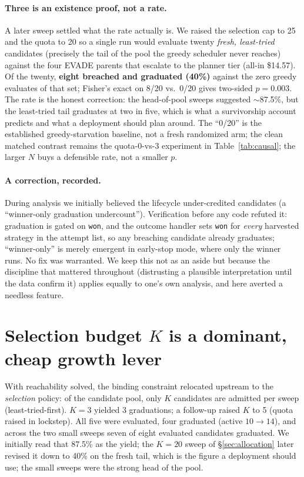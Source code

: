 \documentclass[letterpaper,twocolumn,10pt]{article}
\begin{document}
\paragraph{Three is an existence proof, not a rate.} A later sweep settled what the rate actually is. We raised the selection cap to 25 and the quota to 20 so a single run would evaluate twenty \emph{fresh, least-tried} candidates (precisely the tail of the pool the greedy scheduler never reaches) against the four EVADE parents that escalate to the planner tier (all-in \$14.57). Of the twenty, \textbf{eight breached and graduated (40\%)} against the zero greedy evaluates of that set; Fisher's exact on 8/20 vs.\ 0/20 gives two-sided $p=0.003$. The rate is the honest correction: the head-of-pool sweeps suggested $\sim$87.5\%, but the least-tried tail graduates at two in five, which is what a survivorship account predicts and what a deployment should plan around. The ``0/20'' is the established greedy-starvation baseline, not a fresh randomized arm; the clean matched contrast remains the quota-0-vs-3 experiment in Table~\ref{tab:causal}; the larger $N$ buys a defensible rate, not a smaller $p$.

\paragraph{A correction, recorded.} During analysis we initially believed the lifecycle under-credited candidates (a ``winner-only graduation undercount''). Verification before any code refuted it: graduation is gated on \texttt{won}, and the outcome handler sets \texttt{won} for \emph{every} harvested strategy in the attempt list, so any breaching candidate already graduates; ``winner-only'' is merely emergent in early-stop mode, where only the winner runs. No fix was warranted. We keep this not as an aside but because the discipline that mattered throughout (distrusting a plausible interpretation until the data confirm it) applies equally to one's own analysis, and here averted a needless feature.

\section{Selection budget $K$ is a dominant, cheap growth lever}
\label{sec:K}

With reachability solved, the binding constraint relocated upstream to the \emph{selection} policy: of the candidate pool, only $K$ candidates are admitted per sweep (least-tried-first). $K{=}3$ yielded 3 graduations; a follow-up raised $K$ to 5 (quota raised in lockstep). All five were evaluated, four graduated (active $10\to14$), and across the two small sweeps seven of eight evaluated candidates graduated. We initially read that 87.5\% as the yield; the $K{=}20$ sweep of \S\ref{sec:allocation} later revised it down to 40\% on the fresh tail, which is the figure a deployment should use; the small sweeps were the strong head of the pool.
\end{document}
